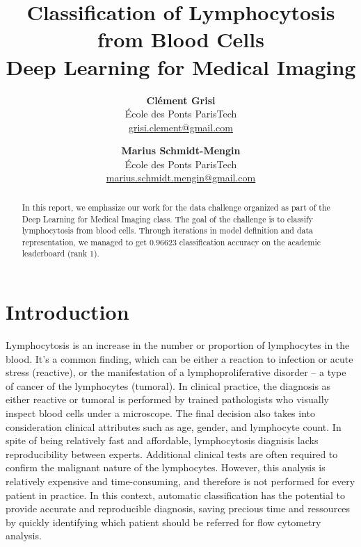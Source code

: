 \documentclass[final]{cvpr}
\begin{document}
	
	\title{Classification of Lymphocytosis from Blood Cells\\
		\vspace{1mm}
		\large \normalfont Deep Learning for Medical Imaging}
	
	\author{\textbf{Clément Grisi}\\
		École des Ponts ParisTech\\
		\small \url{grisi.clement@gmail.com}
	\and
	\textbf{Marius Schmidt-Mengin}\\
	École des Ponts ParisTech\\
	\small \url{marius.schmidt.mengin@gmail.com}
	}
	
	\maketitle
	
	\begin{abstract}
		In this report, we emphasize our work for the data challenge organized as part of the Deep Learning for Medical Imaging class. The goal of the challenge is to classify lymphocytosis from blood cells. Through iterations in model definition and data representation, we managed to get $0.96623$ classification accuracy on the academic leaderboard (rank 1).
	\end{abstract}
	
	\vspace{-3mm}
	
	\section{Introduction}
	
	Lymphocytosis is an increase in the number or proportion of lymphocytes in the blood. It's a common finding, which can be either a reaction to infection or acute stress (reactive), or the manifestation of a lymphoproliferative disorder -- a type of cancer of the lymphocytes (tumoral). In clinical practice, the diagnosis as either reactive or tumoral is performed by trained pathologists who visually inspect blood cells under a microscope. The final decision also takes into consideration clinical attributes such as age, gender, and lymphocyte count. In spite of being relatively fast and affordable, lymphocytosis diagnisis lacks reproducibility between experts. Additional clinical tests are often required to confirm the malignant nature of the lymphocytes. However, this analysis is relatively expensive and time-consuming, and therefore is not performed for every patient in practice. In this context, automatic classification has the potential to provide accurate and reproducible diagnosis, saving precious time and ressources by quickly identifying which patient should be referred for flow cytometry analysis.
	
\end{document}
